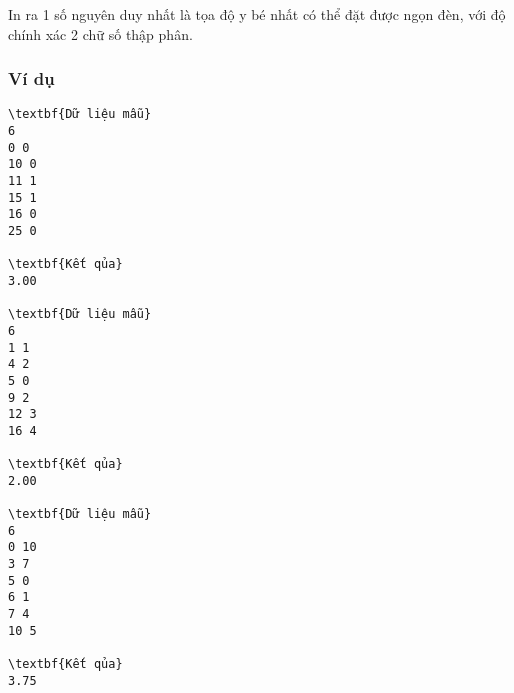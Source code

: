 In ra 1 số nguyên duy nhất là tọa độ y bé nhất có thể đặt được ngọn đèn, với độ chính xác 2 chữ số thập phân.

\subsubsection{Ví dụ}
\begin{verbatim}
\textbf{Dữ liệu mẫu}
6 
0 0 
10 0 
11 1 
15 1 
16 0 
25 0

\textbf{Kết qủa}
3.00

\textbf{Dữ liệu mẫu}
6
1 1
4 2
5 0
9 2
12 3
16 4

\textbf{Kết qủa}
2.00

\textbf{Dữ liệu mẫu}
6
0 10
3 7
5 0
6 1
7 4
10 5

\textbf{Kết qủa}
3.75
\end{verbatim}